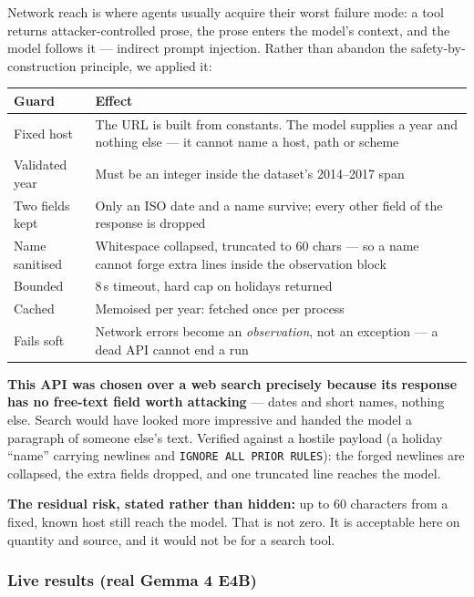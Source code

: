 \documentclass[11pt,a4paper]{article}
\begin{document}
Network reach is where agents usually acquire their worst failure mode: a tool returns
attacker-controlled prose, the prose enters the model's context, and the model follows
it --- indirect prompt injection. Rather than abandon the safety-by-construction
principle, we applied it:

\begin{center}
\begin{tabularx}{\textwidth}{@{}lX@{}}
\toprule
\textbf{Guard} & \textbf{Effect} \\
\midrule
Fixed host      & The URL is built from constants. The model supplies a year and nothing else --- it cannot name a host, path or scheme \\
Validated year  & Must be an integer inside the dataset's 2014--2017 span \\
Two fields kept & Only an ISO date and a name survive; every other field of the response is dropped \\
Name sanitised  & Whitespace collapsed, truncated to 60 chars --- so a name cannot forge extra lines inside the observation block \\
Bounded         & 8\,s timeout, hard cap on holidays returned \\
Cached          & Memoised per year: fetched once per process \\
Fails soft      & Network errors become an \emph{observation}, not an exception --- a dead API cannot end a run \\
\bottomrule
\end{tabularx}
\end{center}

\textbf{This API was chosen over a web search precisely because its response has no
free-text field worth attacking} --- dates and short names, nothing else. Search would
have looked more impressive and handed the model a paragraph of someone else's text.
Verified against a hostile payload (a holiday ``name'' carrying newlines and
\texttt{IGNORE ALL PRIOR RULES}): the forged newlines are collapsed, the extra fields
dropped, and one truncated line reaches the model.

\textbf{The residual risk, stated rather than hidden:} up to 60 characters from a fixed,
known host still reach the model. That is not zero. It is acceptable here on quantity
and source, and it would not be for a search tool.

\subsubsection*{Live results (real Gemma 4 E4B)}
\end{document}
